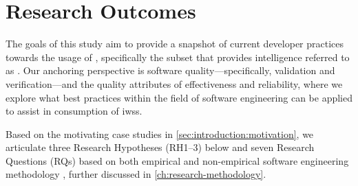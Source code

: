 \section{Research Outcomes}
\label{sec:introduction:hypohtesis}

The goals of this study aim to provide a snapshot of current developer practices towards the usage of , specifically the subset that provides  intelligence referred to as . Our anchoring perspective is software quality---specifically, validation and verification---and the quality attributes of effectiveness and reliability, where we explore  what best practices within the field of software engineering can be applied to assist in consumption of \glspl{iws}.

\ifdefined\review\else\begin{framed}\ifdefined\review\else\end{framed}\fi

Based on the motivating case studies in \cref{sec:introduction:motivation}, we articulate three Research Hypotheses (RH1--3) below and seven Research Questions (RQs) based on  both empirical and non-empirical software engineering methodology \citep{Shull:2007vh,Simon:1996uw}, further discussed in \cref{ch:research-methodology}.

\newcommand{\rh}[1]{\hyperref[rh#1]{RH#1}}
\newcommand{\qualattr}[1]{{\upshape\sffamily\itshape\scshape~#1~}}

